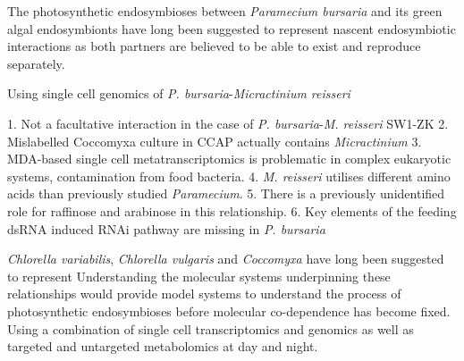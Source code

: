 
The photosynthetic endosymbioses between \textit{Paramecium bursaria} and 
its green algal endosymbionts have long been suggested to represent 
nascent endosymbiotic interactions as both partners are believed
to be able to exist and reproduce separately.

Using single cell genomics of \textit{P. bursaria}-\textit{Micractinium
reisseri} 


1. Not a facultative interaction in the case of \textit{P. bursaria}-\textit{M. reisseri} SW1-ZK
2. Mislabelled Coccomyxa culture in CCAP actually contains \textit{Micractinium}
3. MDA-based single cell metatranscriptomics is problematic in complex
eukaryotic systems, contamination from food bacteria.
4. \textit{M. reisseri} utilises different amino acids than previously studied
\textit{Paramecium}. 
5. There is a previously unidentified role for raffinose and arabinose in this relationship.
6. Key elements of the feeding dsRNA induced RNAi pathway are missing in \textit{P. bursaria}



\textit{Chlorella variabilis}, \textit{Chlorella vulgaris} and \textit{Coccomyxa} have long 
been suggested to represent 
Understanding the molecular systems underpinning these relationships would provide
model systems to understand the process of photosynthetic endosymbioses before molecular
co-dependence has become fixed.  Using a combination of single cell transcriptomics and genomics
as well as targeted and untargeted metabolomics at day and night.
